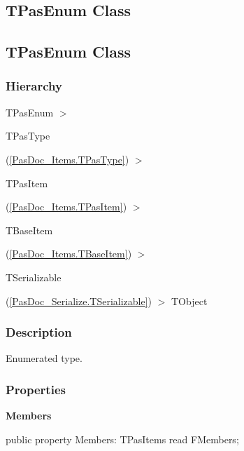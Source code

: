 \documentclass{report}
\newif\ifpdf
\begin{document}
\subsection*{\large{\textbf{TPasEnum Class}}\normalsize\hspace{1ex}\hrulefill}
\else
\subsection*{TPasEnum Class}
\fi
\label{PasDoc_Items.TPasEnum}
\subsubsection*{\large{\textbf{Hierarchy}}\normalsize\hspace{1ex}\hfill}
TPasEnum {$>$} \begin{ttfamily}TPasType\end{ttfamily}(\ref{PasDoc_Items.TPasType}) {$>$} \begin{ttfamily}TPasItem\end{ttfamily}(\ref{PasDoc_Items.TPasItem}) {$>$} \begin{ttfamily}TBaseItem\end{ttfamily}(\ref{PasDoc_Items.TBaseItem}) {$>$} \begin{ttfamily}TSerializable\end{ttfamily}(\ref{PasDoc_Serialize.TSerializable}) {$>$} 
TObject
\subsubsection*{\large{\textbf{Description}}\normalsize\hspace{1ex}\hfill}
Enumerated type.\subsubsection*{\large{\textbf{Properties}}\normalsize\hspace{1ex}\hfill}
\begin{list}{}{
\setlength{\itemindent}{0cm}
\setlength{\listparindent}{0cm}
\setlength{\leftmargin}{\evensidemargin}
\addtolength{\leftmargin}{\tmplength}
\settowidth{\labelsep}{X}
\addtolength{\leftmargin}{\labelsep}
\setlength{\labelwidth}{\tmplength}
}
\label{PasDoc_Items.TPasEnum-Members}
\item[\textbf{Members}\hfill]
\ifpdf
\begin{flushleft}
\fi
\begin{ttfamily}
public property Members: TPasItems read FMembers;\end{ttfamily}

\ifpdf
\end{flushleft}
\fi


\par  \end{list}
\end{document}
